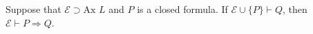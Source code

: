 Suppose that $\mathcal{E} \supset \text{Ax } L$ and $P$ is a closed formula. If $\mathcal{E} \cup \{P\} \vdash Q$, then $\mathcal{E} \vdash P \Rightarrow Q$.

